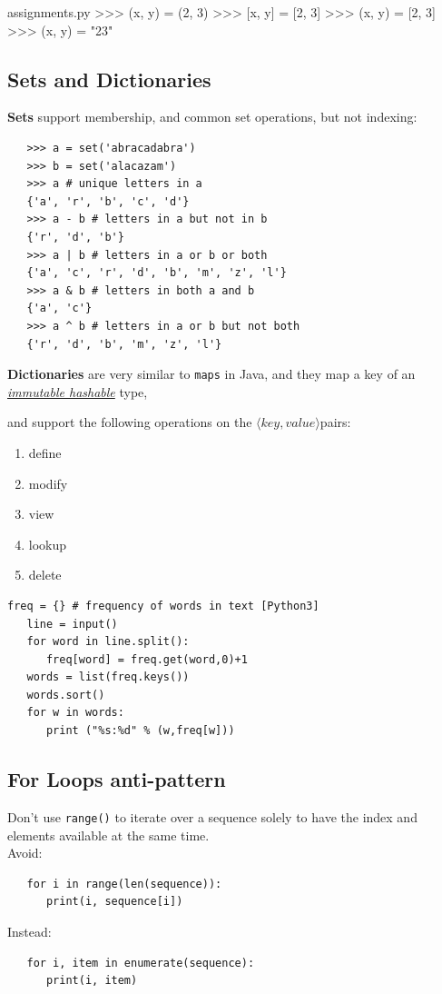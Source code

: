 \begin{filecontents*}{assignments.py}
   >>> (x, y) = (2, 3)
   >>> [x, y] = [2, 3]
   >>> (x, y) = [2, 3]
   >>> (x, y) = "23"
\end{filecontents*}


\subsection{Sets and Dictionaries}
\textbf{Sets} support membership, and common set operations, but not indexing:
\begin{lstlisting}
   >>> a = set('abracadabra')
   >>> b = set('alacazam')
   >>> a # unique letters in a
   {'a', 'r', 'b', 'c', 'd'}
   >>> a - b # letters in a but not in b
   {'r', 'd', 'b'}
   >>> a | b # letters in a or b or both
   {'a', 'c', 'r', 'd', 'b', 'm', 'z', 'l'}
   >>> a & b # letters in both a and b
   {'a', 'c'}
   >>> a ^ b # letters in a or b but not both
   {'r', 'd', 'b', 'm', 'z', 'l'}
\end{lstlisting}

\textbf{Dictionaries} are very similar to \lstinline|maps| in Java, and they map a key of an \underline{\textit{immutable hashable}} type,
{and support the following operations on the $\langle key,value \rangle$pairs:\ns
\begin{enumerate}
   \item define
   \item modify
   \item view
   \item lookup
   \item delete
\end{enumerate}}

\begin{lstlisting}[caption={Usage example}]
   freq = {} # frequency of words in text [Python3]
   line = input()
   for word in line.split():
      freq[word] = freq.get(word,0)+1
   words = list(freq.keys())
   words.sort()
   for w in words:
      print ("%s:%d" % (w,freq[w]))
\end{lstlisting}


\subsection{For Loops anti-pattern}
Don't use \lstinline|range()| to iterate over a sequence solely to
have the index and elements available at the same time.\\
Avoid:
\begin{lstlisting}
   for i in range(len(sequence)):
      print(i, sequence[i])
\end{lstlisting}
Instead:
\begin{lstlisting}
   for i, item in enumerate(sequence):
      print(i, item)
\end{lstlisting}



